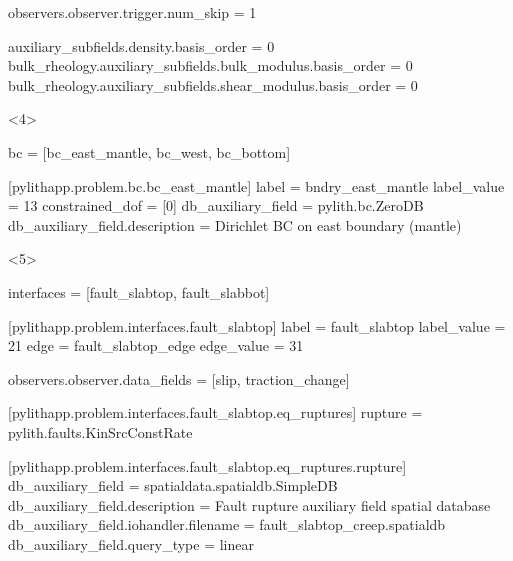\documentclass[aspectratio=169]{beamer}
\begin{document}
\begin{frame}[t,fragile]
\begin{minipage}[t]{0.67\textwidth}
\begin{onlyenv}
\begin{cfgcode}
        observers.observer.trigger.num_skip = 1

        auxiliary_subfields.density.basis_order = 0
        bulk_rheology.auxiliary_subfields.bulk_modulus.basis_order = 0
        bulk_rheology.auxiliary_subfields.shear_modulus.basis_order = 0
      \end{cfgcode}
    \end{onlyenv}
    \begin{onlyenv}<4>
      \begin{cfgcode}
        bc = [bc_east_mantle, bc_west, bc_bottom]

        [pylithapp.problem.bc.bc_east_mantle]
        label = bndry_east_mantle
        label_value = 13
        constrained_dof = [0]
        db_auxiliary_field = pylith.bc.ZeroDB
        db_auxiliary_field.description = Dirichlet BC on east boundary (mantle)
      \end{cfgcode}
    \end{onlyenv}
    \begin{onlyenv}<5>
      \begin{cfgcode}
        interfaces = [fault_slabtop, fault_slabbot]

        [pylithapp.problem.interfaces.fault_slabtop]
        label = fault_slabtop
        label_value = 21
        edge = fault_slabtop_edge
        edge_value = 31

        observers.observer.data_fields = [slip, traction_change]

        [pylithapp.problem.interfaces.fault_slabtop.eq_ruptures]
        rupture = pylith.faults.KinSrcConstRate

        [pylithapp.problem.interfaces.fault_slabtop.eq_ruptures.rupture]
        db_auxiliary_field = spatialdata.spatialdb.SimpleDB
        db_auxiliary_field.description = Fault rupture auxiliary field spatial database
        db_auxiliary_field.iohandler.filename = fault_slabtop_creep.spatialdb
        db_auxiliary_field.query_type = linear
      \end{cfgcode}
    \end{onlyenv}
  \end{minipage}

  
\end{frame}
\end{document}

